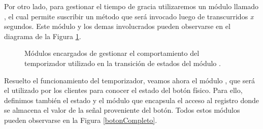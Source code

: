 
Por otro lado, para gestionar el tiempo de gracia utilizaremos un módulo llamado \Temporizador, el cual permite suscribir un método que será invocado luego de transcurridos \textit{x} segundos. Este módulo y los demas involucrados pueden observarse en el diagrama de la Figura \ref{modulosBoton}.

\begin{figure}[H]
\caption{Módulos encargados de gestionar el comportamiento del temporizador utilizado en la transición de estados del módulo \Boton.}
\label{modulosBoton}
\begin{center}
\end{center}
\end{figure}


Resuelto el funcionamiento del temporizador, veamos ahora el módulo \Boton, que será el utilizado por los clientes para conocer el estado del botón físico. Para ello, definimos también el estado y el módulo que encapsula el acceso al registro donde se almacena el valor de la señal proveniente del botón. Todos estos módulos pueden observarse en la Figura \ref{botonCompleto}.


